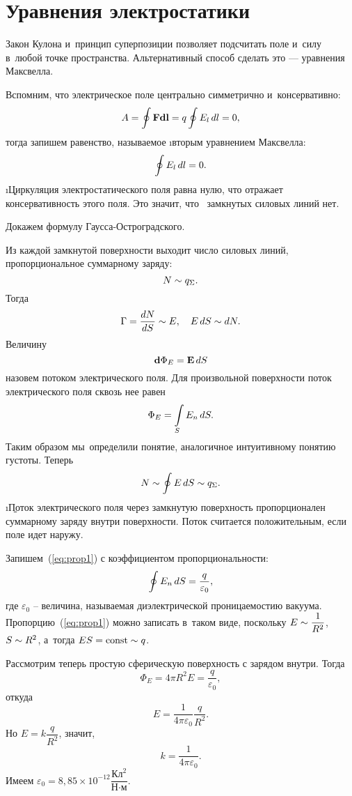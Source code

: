 \section{Уравнения электростатики}

	Закон Кулона и~принцип суперпозиции позволяет подсчитать поле и~силу в~любой точке пространства. Альтернативный способ сделать это --- уравнения Максвелла. \par
	Вспомним, что электрическое поле центрально симметрично и~консервативно:
		$$A=\oint \text{\textbf{F}} \textbf{d}\text{\textbf{l}}=q\oint E_l\,d l=0,$$
	тогда запишем равенство, называемое \i{вторым уравнением Максвелла}:
		\begin{equation}
			\oint E_l\,d l =0.
		\end{equation}
	\i{\b{Циркуляция электростатического поля равна нулю, что отражает консервативность этого поля}}. Это значит, что \, замкнутых силовых линий нет.\par
	Докажем формулу Гаусса-Остроградского.\par
	Из каждой замкнутой поверхности выходит число силовых линий, пропорциональное суммарному заряду:
		$$N\sim q_{\Sigma}.$$
	Тогда
		$$\Gamma=\frac{dN}{dS}\sim E, \quad E\, dS\sim dN.$$
	Величину 
		$$\textbf{d}{\Phi_E}=\text{\textbf{E}}\,d S$$
	назовем потоком электрического поля. Для произвольной поверхности поток электрического поля сквозь нее равен
		\begin{equation}
			\Phi_E=\int\limits_S E_n\,d S.
		\end{equation}
	Таким образом мы~определили понятие, аналогичное интуитивному понятию густоты. Теперь
		\begin{equation}\label{eq:prop1}
			N\sim\oint E\,d S\sim q_{\Sigma}.
		\end{equation}
	\i{\b{Поток электрического поля через замкнутую поверхность пропорционален суммарному заряду внутри поверхности.}} Поток считается положительным, если поле идет наружу.\par
	Запишем~(\ref{eq:prop1}) с коэффициентом пропорциональности:
		\begin{equation}
			\oint E_n\,d S=\frac{q}{\varepsilon_0},
		\end{equation}
	где $\varepsilon_0$ -- величина, называемая диэлектрической проницаемостию вакуума. Пропорцию~(\ref{eq:prop1}) можно записать в~таком виде, поскольку $E\sim\dfrac{1}{R^2}$, $S\sim R^2$, а~тогда $ES=\mathrm{const}\sim q$.\par
	Рассмотрим теперь простую сферическую поверхность с зарядом внутри. Тогда
		$$\Phi_E=4\pi R^2 E=\frac{q}{\varepsilon_0},$$
	откуда
		$$E=\frac{1}{4\pi\varepsilon_0}\frac{q}{R^2}.$$
	Но $E=k\dfrac{q}{R^2}$, значит,
		\begin{equation}
			k=\frac{1}{4\pi\varepsilon_0}.
		\end{equation}
	Имеем $\varepsilon_0=8,85\times 10^{-12} \dfrac{\text{Кл}^2}{\text{Н}\cdot\text{м}}$.